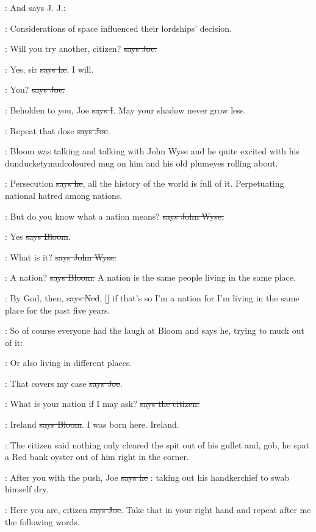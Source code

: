 \Nq:
And says J. J.:

\jjom:
Considerations of space influenced
their lordships' decision.

\joe:
Will you try another, citizen? \sout{says Joe.}

\citizen:
Yes, sir \sout{says he}. I will.

\joe:
You? \sout{says Joe.}

:
Beholden to you, Joe \sout{says I}.
May your shadow never grow less.

\joe:
Repeat that dose \sout{says Joe}.

\Nq:
Bloom was talking and talking with John Wyse and he quite excited with
his dunducketymudcoloured mug on him and his old plumeyes rolling about.

\Bloom:
Persecution \sout{says he},
all the history of the world is full of it.
Perpetuating national hatred among nations.

\johnwyse:
But do you know what a nation means?
\sout{says John Wyse.}

\Bloom:
Yes \sout{says Bloom}.

\johnwyse:
What is it? \sout{says John Wyse.}

\Bloom:
A nation? \sout{says Bloom.}
A nation is the same people living in the same place.

\lambert:
By God, then, \sout{says Ned},
[] if that's so I'm a nation for I'm
living in the same place for the past five years.

\Nq:
So of course everyone had the laugh at Bloom and says he, trying to
muck out of it:

\Bloom:
Or also living in different places.

\joe:
That covers my case \sout{says Joe}.

\citizen:
What is your nation if I may ask?
\sout{says the citizen.}

\Bloom:
Ireland \sout{says Bloom}.
I was born here. Ireland.

\Nq:
The citizen said nothing only cleared the spit out of his gullet and,
gob, he spat a Red bank oyster out of him right in the corner.

\citizen:
After you with the push, Joe \sout{says he}
\Nq:
taking out his handkerchief to
swab himself dry.

\joe:
Here you are, citizen \sout{says Joe}.
Take that in your right hand and repeat
after me the following words.

